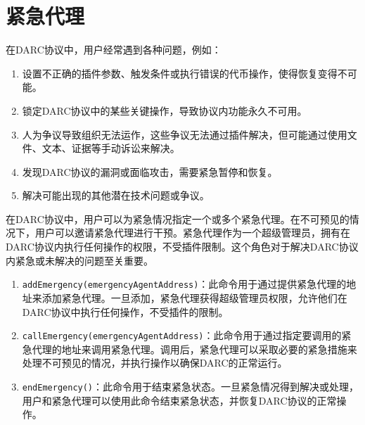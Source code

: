 \documentclass[main.tex]{subfiles}
\begin{document}
\section{紧急代理}

在DARC协议中，用户经常遇到各种问题，例如：

\begin{enumerate}
    \item 设置不正确的插件参数、触发条件或执行错误的代币操作，使得恢复变得不可能。
    \item 锁定DARC协议中的某些关键操作，导致协议内功能永久不可用。
    \item 人为争议导致组织无法运作，这些争议无法通过插件解决，但可能通过使用文件、文本、证据等手动诉讼来解决。
    \item 发现DARC协议的漏洞或面临攻击，需要紧急暂停和恢复。
    \item 解决可能出现的其他潜在技术问题或争议。
\end{enumerate}

在DARC协议中，用户可以为紧急情况指定一个或多个紧急代理。在不可预见的情况下，用户可以邀请紧急代理进行干预。紧急代理作为一个超级管理员，拥有在DARC协议内执行任何操作的权限，不受插件限制。这个角色对于解决DARC协议内紧急或未解决的问题至关重要。

\begin{enumerate}
    \item \texttt{addEmergency(emergencyAgentAddress)}：此命令用于通过提供紧急代理的地址来添加紧急代理。一旦添加，紧急代理获得超级管理员权限，允许他们在DARC协议中执行任何操作，不受插件的限制。

    \item \texttt{callEmergency(emergencyAgentAddress)}：此命令用于通过指定要调用的紧急代理的地址来调用紧急代理。调用后，紧急代理可以采取必要的紧急措施来处理不可预见的情况，并执行操作以确保DARC的正常运行。

    \item \texttt{endEmergency()}：此命令用于结束紧急状态。一旦紧急情况得到解决或处理，用户和紧急代理可以使用此命令结束紧急状态，并恢复DARC协议的正常操作。
\end{enumerate}
\end{document}
